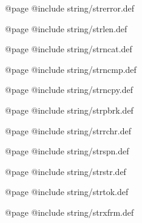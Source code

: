 @page
@include string/strerror.def

@page
@include string/strlen.def

@page
@include string/strncat.def

@page
@include string/strncmp.def

@page
@include string/strncpy.def

@page
@include string/strpbrk.def

@page
@include string/strrchr.def

@page
@include string/strspn.def

@page
@include string/strstr.def

@page
@include string/strtok.def

@page
@include string/strxfrm.def

